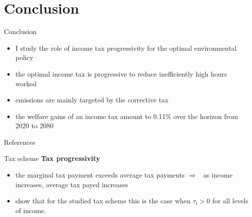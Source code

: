 \documentclass[11pt,aspectratio=169]{beamer}
\newcommand{\ar}{$\Rightarrow$ \ }
\begin{document}
\section*{Conclusion}
\begin{frame}{Conclusion}
	\begin{itemize}[<+-| alert@+>]
	\item I study the role of income tax progressivity for the optimal environmental policy %
	\vspace{3mm}
	\item the optimal income tax is progressive to reduce inefficiently high
	hours worked
	\vspace{3mm}
	\item emissions are mainly targeted by the corrective tax
		\vspace{3mm}
	\item the welfare gains of an income tax amount to 0.11\%  over the horizon from 2020 to 2080 %
   \vspace{3mm}
\end{itemize}
\end{frame}
\begin{frame}[shrink]{References}
	
	
	
\end{frame}



\appendix

\begin{frame}{Tax scheme}
	\hypertarget{taxsc}{}
\textbf{Tax progressivity}
\begin{itemize}
	\item the marginal tax payment exceeds average tax payments \ar as income increases, average tax payed increases
	\item \cite{Heathcote2017OptimalFramework} show that for the studied tax scheme this is the case when $\tau_l>0$ for all levels of income. 
\end{itemize}
\end{frame}
\end{document}
